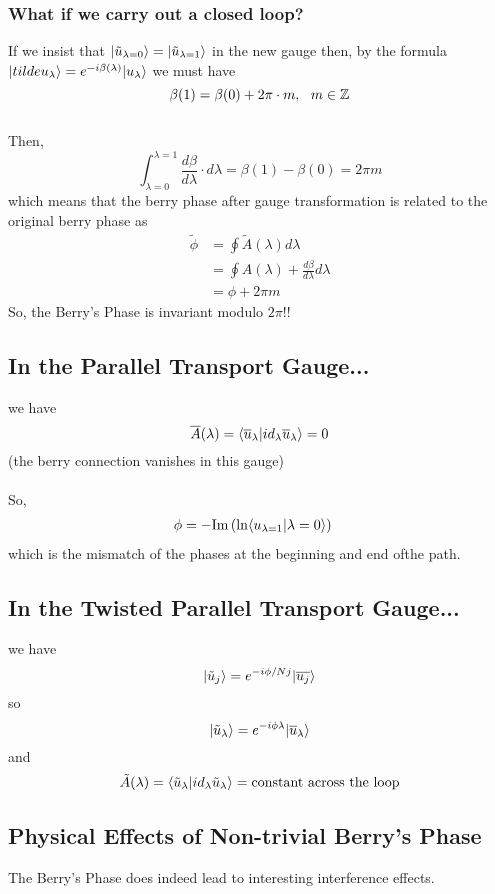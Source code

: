 \documentclass[11pt]{article}
\begin{document}
\subsubsection{What if we carry out a closed loop?}
If we insist that $\lvert\tilde{u}_{\lambda=0}\rangle = \lvert\tilde{u}_{\lambda=1}\rangle$ in the new gauge then, by the formula $ \lvert tilde{u}_{\lambda}\rangle = e^{-i\beta(\lambda)} \lvert u_{\lambda}\rangle $ we must have $$ \beta(1) = \beta(0) + 2\pi \cdot m,~~m \in \mathbb{Z}  $$
\\
Then, $$ \int_{\lambda=0}^{\lambda=1} \frac{d\beta}{d\lambda} \cdot d\lambda = \beta(1) - \beta(0) = 2\pi m $$ which means that the berry phase after gauge transformation is related to the original berry phase as 
\begin{align*}
  \tilde{\phi} &= \oint \tilde{A}(\lambda) d\lambda \\
  &= \oint A(\lambda) + \frac{d\beta}{d\lambda} d\lambda \\
  &= \phi + 2\pi m
\end{align*}
So, the Berry's Phase is invariant modulo $2\pi$!!

\vskip 1cm
\subsection{In the Parallel Transport Gauge...}
we have $$ \overline{A}(\lambda) = \langle \overline{u}_{\lambda} | i d_{\lambda} \overline{u}_{\lambda} \rangle = 0 $$ (the berry connection vanishes in this gauge)
\\
\\
So, 
\begin{align*}
  \phi &= -\mathrm{Im} \left( \mathrm{ln} \langle u_{\lambda=1} | \lambda=0 \rangle \right) 
\end{align*} which is the mismatch of the phases at the beginning and end ofthe path.

\vskip 1cm
\subsection{In the Twisted Parallel Transport Gauge...}
we have $$ \lvert\tilde{u}_{j}\rangle = e^{-i\phi/N j } \lvert\overline{u_j}\rangle $$ so $$ \lvert\tilde{u}_{\lambda}\rangle = e^{-i\phi \lambda} \lvert\overline{u}_{\lambda}\rangle $$ and $$ \tilde{A}(\lambda) = \langle \tilde{u}_{\lambda} | id_{\lambda} \tilde{u}_{\lambda}  \rangle = \text{constant across the loop} $$

\vskip 1cm
\subsection{Physical Effects of Non-trivial Berry's Phase}
The Berry's Phase does indeed lead to interesting interference effects.
\\
\\
\end{document}
